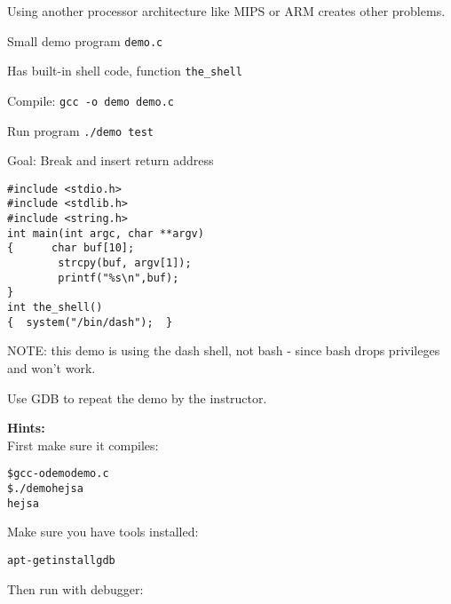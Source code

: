 \documentclass[a4paper,11pt,notitlepage]{report}
\begin{document}
Using another processor architecture like MIPS or ARM creates other problems.

\begin{list2}
\item Small demo program \verb+demo.c+
\item Has built-in shell code, function \verb+the_shell+
\item Compile:
\verb+gcc -o demo demo.c+
\item Run program
\verb+./demo test+
\item Goal: Break and insert return address
\end{list2}

\begin{verbatim}
#include <stdio.h>
#include <stdlib.h>
#include <string.h>
int main(int argc, char **argv)
{      char buf[10];
        strcpy(buf, argv[1]);
        printf("%s\n",buf);
}
int the_shell()
{  system("/bin/dash");  }
\end{verbatim}

NOTE: this demo is using the dash shell, not bash - since bash drops privileges and won't work.

Use GDB to repeat the demo by the instructor.

{\bf Hints:}\\
First make sure it compiles:
\begin{alltt}
\$ gcc -o demo demo.c
\$ ./demo hejsa
hejsa
\end{alltt}

Make sure you have tools installed:
\begin{alltt}
apt-get install gdb
\end{alltt}

Then run with debugger:
\end{document}
